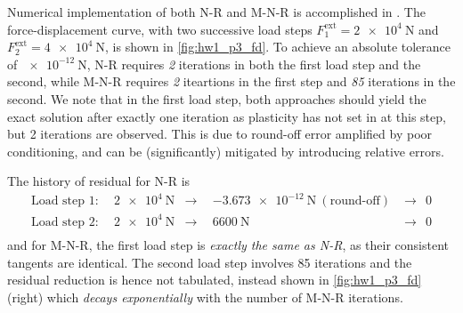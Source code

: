 Numerical implementation of both N-R and M-N-R is accomplished in \matlab. 
The force-displacement curve, with two successive load steps $F^{\textrm{ext}}_1 = \qty{2e+4}{\newton}$ and $F^{\textrm{ext}}_2 = \qty{4e+4}{\newton}$, is shown in \cref{fig:hw1_p3_fd}.
To achieve an absolute tolerance of $\qty{e-12}{\newton}$, N-R requires \emph{2} iterations in both the first load step and the second, while M-N-R requires \emph{2} iteartions in the first step and \emph{85} iterations in the second.
We note that in the first load step, both approaches should yield the exact solution after exactly one iteration as plasticity has not set in at this step, but 2 iterations are observed. 
This is due to round-off error amplified by poor conditioning, and can be (significantly) mitigated by introducing relative errors. 

The history of residual for N-R is 
\begin{align*}
    \textrm{Load step 1}: &~~ \qty{2e+4}{\newton} &\rightarrow& ~~ \qty{-3.673e-12}{\newton}~(\textrm{round-off}) &\rightarrow ~~ 0 \\
    \textrm{Load step 2}: &~~ \qty{2e+4}{\newton} &\rightarrow& ~~ \qty{6600}{\newton} &\rightarrow ~~ 0 \\
\end{align*}
and for M-N-R, the first load step is \emph{exactly the same as N-R}, as their consistent tangents are identical. 
The second load step involves 85 iterations and the residual reduction is hence not tabulated, instead shown in \cref{fig:hw1_p3_fd} (right) which \emph{decays exponentially} with the number of M-N-R iterations. 


